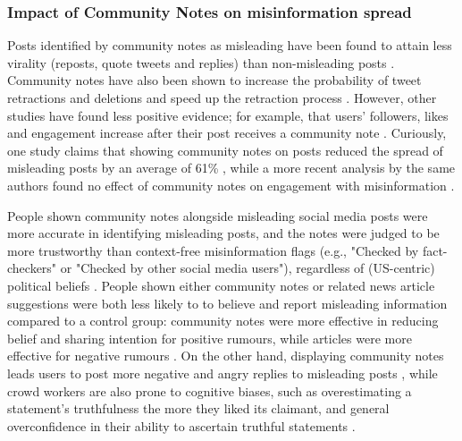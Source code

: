 \subsubsection{Impact of Community Notes on misinformation spread}
Posts identified by community notes as misleading have been found to attain less virality (reposts, quote tweets and replies) than non-misleading posts \cite{drolsbach_diffusion_2023,renault_collaboratively_2024}.
Community notes have also been shown to increase the probability of tweet retractions and deletions and speed up the retraction process \cite{gao_can_2024,renault_collaboratively_2024}.
However, other studies have found less positive evidence; for example, that users' followers, likes and engagement increase after their post receives a community note \cite{wirtschafter2023future}.
Curiously, one study claims that showing community notes on posts reduced the spread of misleading posts by an average of 61\% \cite{chuai_community_2024}, while a more recent analysis by the same authors found no effect of community notes on engagement with misinformation \cite{chuai_did_2024}.

People shown community notes alongside misleading social media posts were more accurate in identifying misleading posts, and the notes were judged to be more trustworthy than context-free misinformation flags (e.g., "Checked by fact-checkers" or "Checked by other social media users"), regardless of (US-centric) political beliefs \cite{drolsbach2024community}.
People shown either community notes or related news article suggestions were both less likely to to believe and report misleading information compared to a control group: community notes were more effective in reducing belief and sharing intention for positive rumours, while articles were more effective for negative rumours \cite{kankham_community_2024}.
On the other hand, displaying community notes leads users to post more negative and angry replies to misleading posts \cite{chuai_community_2024-1}, while crowd workers are also prone to cognitive biases, such as overestimating a statement's truthfulness the more they liked its claimant, and general overconfidence in their ability to ascertain truthful statements \cite{draws_effects_2022}.


